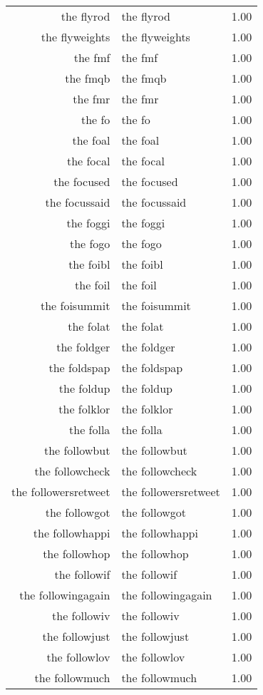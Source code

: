 \begin{table}[ht]
\begin{tabular}{rlr}
  the flyrod & the flyrod & 1.00 \\ 
  the flyweights & the flyweights & 1.00 \\ 
  the fmf & the fmf & 1.00 \\ 
  the fmqb & the fmqb & 1.00 \\ 
  the fmr & the fmr & 1.00 \\ 
  the fo & the fo & 1.00 \\ 
  the foal & the foal & 1.00 \\ 
  the focal & the focal & 1.00 \\ 
  the focused & the focused & 1.00 \\ 
  the focussaid & the focussaid & 1.00 \\ 
  the foggi & the foggi & 1.00 \\ 
  the fogo & the fogo & 1.00 \\ 
  the foibl & the foibl & 1.00 \\ 
  the foil & the foil & 1.00 \\ 
  the foisummit & the foisummit & 1.00 \\ 
  the folat & the folat & 1.00 \\ 
  the foldger & the foldger & 1.00 \\ 
  the foldspap & the foldspap & 1.00 \\ 
  the foldup & the foldup & 1.00 \\ 
  the folklor & the folklor & 1.00 \\ 
  the folla & the folla & 1.00 \\ 
  the followbut & the followbut & 1.00 \\ 
  the followcheck & the followcheck & 1.00 \\ 
  the followersretweet & the followersretweet & 1.00 \\ 
  the followgot & the followgot & 1.00 \\ 
  the followhappi & the followhappi & 1.00 \\ 
  the followhop & the followhop & 1.00 \\ 
  the followif & the followif & 1.00 \\ 
  the followingagain & the followingagain & 1.00 \\ 
  the followiv & the followiv & 1.00 \\ 
  the followjust & the followjust & 1.00 \\ 
  the followlov & the followlov & 1.00 \\ 
  the followmuch & the followmuch & 1.00 \\ 

\end{tabular}
\end{table}
